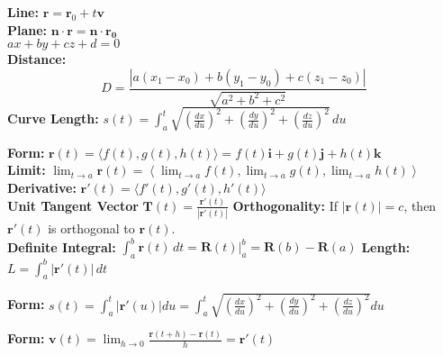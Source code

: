 \documentclass[2pt]{article}
\begin{document}
\begin{multicols}{2}
\begin{tcolorbox}[title=\textbf{Lines and Planes}, colframe=lightblue]
\textbf{Line:} $\mathbf{r} = \mathbf{r}_0 + t \mathbf{v}$ \\
\textbf{Plane:} $\mathbf{n} \cdot \mathbf{r} = \mathbf{n} \cdot \mathbf{r_0}$ \\
$ax + by + cz + d = 0$ \\
\textbf{Distance:}  
    \[ D = \frac{|a(x_1 - x_0) + b(y_1 - y_0) + c(z_1 - z_0)|}{\sqrt{a^2 + b^2 + c^2}} \]
\textbf{Curve Length:} $s(t) = \int_{a}^{t} \sqrt{\left(\frac{dx}{du}\right)^2 + \left(\frac{dy}{du}\right)^2 + \left(\frac{dz}{du}\right)^2} \, du$
\end{tcolorbox}

\begin{tcolorbox}[title=\textbf{Vector Value Functions}, colframe=lightblue]
    \textbf{Form:} 	$ \mathbf{r}(t) = \langle f(t), g(t), h(t) \rangle = f(t) \mathbf{i} + g(t) \mathbf{j} + h(t) \mathbf{k} $ \\
    \textbf{Limit:} $ \lim_{t \to a} \mathbf{r}(t) = \left\langle \lim_{t \to a} f(t), \lim_{t \to a} g(t), \lim_{t \to a} h(t) \right\rangle $ \\
    \textbf{Derivative:} $\mathbf{r}'(t) = \langle f'(t), g'(t), h'(t) \rangle $ \\
    \textbf{Unit Tangent Vector} $\mathbf{T}(t) = \frac{\mathbf{r}'(t)}{|\mathbf{r}'(t)|}$
    \textbf{Orthogonality:} If \(|\mathbf{r}(t)| = c\), then \(\mathbf{r}'(t)\) is orthogonal to \(\mathbf{r}(t)\). \\
    \textbf{Definite Integral:} $ \int_a^b \mathbf{r}(t) \, dt = \mathbf{R}(t) \Big|_a^b = \mathbf{R}(b) - \mathbf{R}(a) $
    \textbf{Length:} $ L = \int_a^b |\mathbf{r}'(t)| \, dt$
\end{tcolorbox}

\begin{tcolorbox}[title=\textbf{Curvature}, colframe=lightblue]
    \textbf{Form:} 	$ s(t) = \int_{a}^{t} |\mathbf{r}'(u)| du = \int_{a}^{t} \sqrt{\left(\frac{dx}{du}\right)^{2} + \left(\frac{dy}{du}\right)^{2} + \left(\frac{dz}{du}\right)^{2}} du $ 
\end{tcolorbox}

\begin{tcolorbox}[title=\textbf{Motion in space}, colframe=lightblue]
    \textbf{Form:} 	$ \mathbf{v}(t) = \lim_{{h \to 0}} \frac{\mathbf{r}(t + h) - \mathbf{r}(t)}{h} = \mathbf{r}'(t) $ 
\end{tcolorbox}


\end{multicols}
\end{document}
